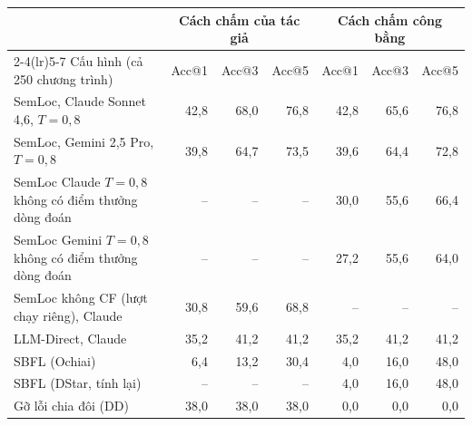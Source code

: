 \begin{tabular}{lrrrrrr}
\toprule
 & \multicolumn{3}{c}{Cách chấm của tác giả} & \multicolumn{3}{c}{Cách chấm công bằng} \\
\cmidrule(lr){2-4}\cmidrule(lr){5-7}
Cấu hình (cả 250 chương trình) & Acc@1 & Acc@3 & Acc@5 & Acc@1 & Acc@3 & Acc@5 \\
\midrule
SemLoc, Claude Sonnet 4,6, $T{=}0,8$ & 42,8 & 68,0 & 76,8 & 42,8 & 65,6 & 76,8 \\
SemLoc, Gemini 2,5 Pro, $T{=}0,8$ & 39,8 & 64,7 & 73,5 & 39,6 & 64,4 & 72,8 \\
SemLoc Claude $T{=}0,8$ không có điểm thưởng dòng đoán & -- & -- & -- & 30,0 & 55,6 & 66,4 \\
SemLoc Gemini $T{=}0,8$ không có điểm thưởng dòng đoán & -- & -- & -- & 27,2 & 55,6 & 64,0 \\
SemLoc không CF (lượt chạy riêng), Claude & 30,8 & 59,6 & 68,8 & -- & -- & -- \\
LLM-Direct, Claude & 35,2 & 41,2 & 41,2 & 35,2 & 41,2 & 41,2 \\
SBFL (Ochiai) & 6,4 & 13,2 & 30,4 & 4,0 & 16,0 & 48,0 \\
SBFL (DStar, tính lại) & -- & -- & -- & 4,0 & 16,0 & 48,0 \\
Gỡ lỗi chia đôi (DD) & 38,0 & 38,0 & 38,0 & 0,0 & 0,0 & 0,0 \\
\bottomrule
\end{tabular}
